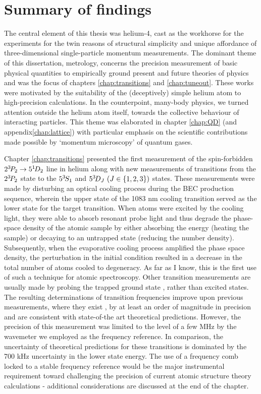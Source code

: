 \section*{Summary of findings}
	{The} central element of this thesis was helium-4, cast as the workhorse for the experiments for the twin reasons of structural simplicity and unique affordance of three-dimensional single-particle momentum measurements.
	The dominant theme of this dissertation,  metrology, concerns the precision measurement of basic physical quantities to empirically ground present and future theories of physics and was the focus of chapters \ref{chap:transitions} and \ref{chap:tuneout}. 
	These works were motivated by the suitability of the (deceptively) simple helium atom to high-precision calculations.
	In the counterpoint, many-body physics, we turned attention outside the helium atom itself, towards the collective behaviour of interacting particles.
	This theme was elaborated in chapter \ref{chap:QD} (and appendix\ref{chap:lattice}) with particular emphasis on the scientific contributions made possible by `momentum microscopy' of quantum gases.

	Chapter \ref{chap:transitions} presented the first measurement of the spin-forbidden $2^{3\!} P_2\rightarrow 5^{1\!} D_2$ line in helium along with new measurements of transitions from the $2^{3\!} P_2$ state to the $5^{3\!} S_1$ and $5^{3\!} D_J~(J\in\{1,2,3\})$ states. 
	These measurements were made by disturbing an optical cooling process during the BEC production sequence, wherein the upper state of the 1083 nm cooling transition served as the lower state for the target transition. 
	When atoms were excited by the cooling light, they were able to absorb resonant probe light and thus degrade the phase-space density of the atomic sample by either absorbing the energy (heating the sample) or decaying to an untrapped state (reducing the number density).
	Subsequently, when the evaporative cooling process amplified the phase space density, the perturbation in the initial condition resulted in a decrease in the total number of atoms cooled to degeneracy.
	As far as I know, this is the first use of such a technique for atomic spectroscopy.
	Other transition measurements are usually made by probing the trapped ground state \cite{Thomas20,Rengelink18,Notermans14}, rather than excited states.
	The resulting determinations of transition frequencies improve upon previous measurements, where they exist \cite{Martin60}, by at least an order of magnitude in precision and are consistent with state-of-the art theoretical predictions.
	However, the precision of this measurement was limited to the level of a few MHz by the wavemeter we employed as the frequency reference.
	In comparison, the uncertainty of theoretical predictions for these transitions is dominated by the 700 kHz uncertainty in the lower state energy.
	The use of a frequency comb locked to a stable frequency reference would be the major instrumental requirement toward challenging the precision of current atomic structure theory calculations - additional considerations are discussed at the end of the chapter.
	


